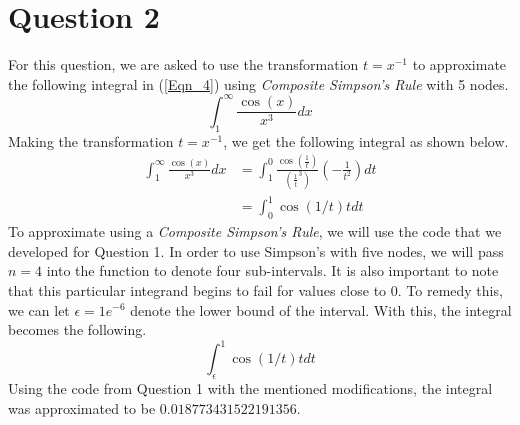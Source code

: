 \documentclass{article}
\begin{document}
\section{Question 2}
For this question, we are asked to use the transformation \(t=x^{-1}\) to approximate the following integral in (\ref{Eqn_4}) using \textit{Composite Simpson's Rule} with 5 nodes.
\begin{equation}
    \label{Eqn_4}
    \int_1^\infty\frac{\cos{(x)}}{x^3}dx
\end{equation}
Making the transformation \(t=x^{-1}\), we get the following integral as shown below.
\[
\begin{split}
        \int_1^\infty\frac{\cos{(x)}}{x^3}dx &= \int_1^0\frac{\cos{(\frac{1}{t})}}{\left(\frac{1}{t}^3\right)}\left(-\frac{1}{t^2}\right)dt \\
        &= \int_0^1\cos\left(1/t\right)tdt
\end{split}
\]
To approximate using a \textit{Composite Simpson's Rule}, we will use the code that we developed for Question 1. In order to use Simpson's with five nodes, we will pass \(n=4\) into the function to denote four sub-intervals. It is also important to note that this particular integrand begins to fail for values close to \(0\). To remedy this, we can let \(\epsilon=1e^{-6}\) denote the lower bound of the interval. With this, the integral becomes the following.
\[
\int_\epsilon^1\cos\left(1/t\right)tdt
\]
Using the code from Question 1 with the mentioned modifications, the integral was approximated to be \(0.018773431522191356\).

\end{document}
